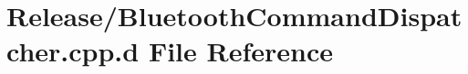 \hypertarget{_release_2_bluetooth_command_dispatcher_8cpp_8d}{\section{\-Release/\-Bluetooth\-Command\-Dispatcher.cpp.\-d \-File \-Reference}
\label{_release_2_bluetooth_command_dispatcher_8cpp_8d}
}

